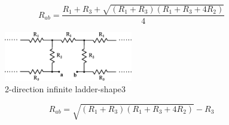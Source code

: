 \documentclass[a4 paper]{article}
\numberwithin{equation}{section}
\newcommand{\0}{\mathbf{0}}
\begin{document}
\begin{equation}
R_{ab} = \frac{R_1 + R_3 + \sqrt{(R_1 + R_3)(R_1 + R_3 + 4R_2)}}{4}
\end{equation}


\begin{figure}[ht]
  \caption{2-direction infinite ladder-shape3}
  \label{equ_resisinf4}
  \centering
  \includegraphics[width=0.5\textwidth]{./images/equ_resisinf4}
\end{figure}

\begin{equation}
R_{ab} = \sqrt{(R_1 + R_3)(R_1 + R_3 + 4R_2)}-R_3
\end{equation}



%
%
\end{document}
